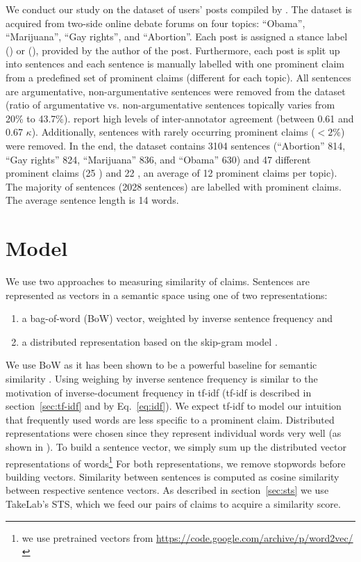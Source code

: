 We conduct our study on the dataset of users' posts compiled by \citet{hasan2014you}. 
The dataset is acquired from two-side online debate forums on four topics: 
``Obama'', ``Marijuana'', ``Gay rights'', and ``Abortion''.
Each post is assigned a stance label () or (), provided by
the author of the post. 
Furthermore, each post is split up into sentences and each sentence is manually labelled
with one prominent claim from a predefined set of prominent claims 
(different for each topic). 
All sentences are argumentative, non-argumentative sentences were removed from
the dataset (ratio of argumentative vs. non-argumentative sentences topically
varies from  20\% to 43.7\%). 
\citet{hasan2014you} report high levels of inter-annotator agreement (between
0.61 and 0.67 $\kappa$). 
Additionally, sentences with rarely occurring prominent claims ($<2\%$) were removed. 
In the end, the dataset contains 3104 sentences (``Abortion'' 814, ``Gay rights'' 824, 
``Marijuana'' 836, and ``Obama'' 630) and 47 different prominent claims
(25 ) and 22 , an
average of 12 prominent claims per topic). The majority of sentences (2028
sentences) are labelled with  prominent claims.
The average sentence length is 14 words. 

\section{Model}
\label{sec:argclu_model}

We use two approaches to measuring similarity of claims. 
Sentences are represented as vectors in a semantic space
using one of two representations:
\begin{enumerate} 
\item a bag-of-word (BoW) vector, weighted
by inverse sentence frequency and 
\item a distributed representation based on the skip-gram model
	\citep{mikolov2013distributed}. 
\end{enumerate}
We use BoW as it has been shown to be a powerful baseline for semantic
similarity \citep{ramage2009random}. 
Using weighing by inverse sentence frequency is similar to the motivation 
of inverse-document frequency in tf-idf (tf-idf is described in
section~\ref{sec:tf-idf} and by Eq.~\ref{eq:idf}). We expect tf-idf 
to model our intuition that frequently used words are less
specific to a prominent claim. 
Distributed representations were chosen since they represent individual words 
very well (as shown in \citep{mikolov2013efficient, mikolov2013distributed}).
To build a sentence vector, we simply sum up the distributed vector representations 
of words\footnote{we use pretrained vectors from \url{https://code.google.com/archive/p/word2vec/}}
For both representations, we remove stopwords before building vectors. 
Similarity between sentences is computed as cosine similarity between 
respective sentence vectors. 
As described in section~\ref{sec:sts} we use TakeLab's STS, which we feed our pairs
of claims to acquire a similarity score. 

